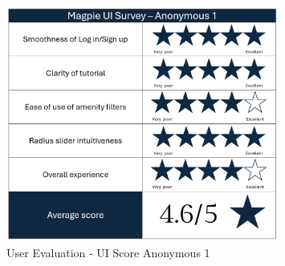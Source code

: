 \begin{figure}
    \centering
    \includegraphics[width=0.8\textwidth]{images/survey-maira.png}
    \caption{User Evaluation - UI Score Anonymous 1}
\end{figure}

\newpage

